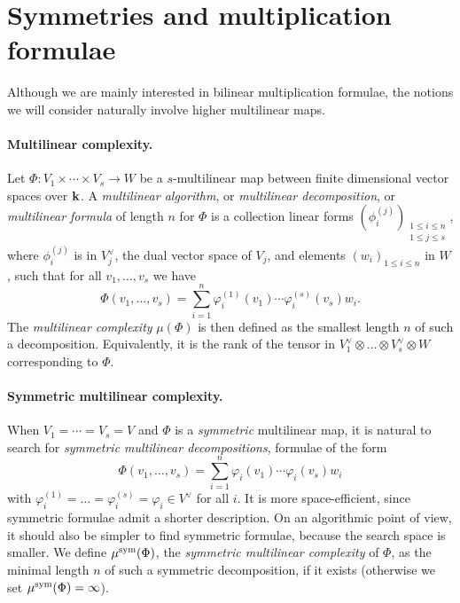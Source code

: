 \documentclass[11pt]{article}
\begin{document}
\section{Symmetries and multiplication formulae}
\label{sec:symtrisym}

Although we are mainly interested in bilinear multiplication formulae,
the notions we will consider naturally involve higher multilinear maps.

\paragraph{Multilinear complexity.}
Let $\Phi:V_1\times\cdots\times V_s\to W$
be a $s$-multilinear map between finite dimensional vector spaces over $\mathbf{k}$.
A \emph{multilinear algorithm}, or \emph{multilinear decomposition}, or \emph{multilinear formula} of length $n$ for $\Phi$ is a collection linear
forms $(\phi_i^{(j)})_{\substack{1\leq i \leq n\\1\leq j\leq s}}$,
where $\phi_i^{(j)}$ is in $V_j^\vee$, the dual vector space of $V_j$,
and elements $(w_i)_{1\leq i \leq n}$ in $W$, 
such that for all $v_1,\dots,v_s$ we have
\[
  \Phi(v_1,\dots,v_s)=\sum_{i=1}^{n}\varphi_i^{(1)}(v_1)\cdots\varphi_i^{(s)}(v_s)w_i.
\]
The \emph{multilinear complexity} $\mu(\Phi)$ is then defined as the smallest
length $n$ of such a decomposition.
Equivalently, it is the rank of the tensor in
$V_1^\vee \otimes\dots\otimes V_s^\vee\otimes W$
corresponding to $\Phi$.

\paragraph{Symmetric multilinear complexity.}
When $V_1=\cdots=V_s=V$ and $\Phi$ is a \emph{symmetric} multilinear map, it is
natural to search for \emph{symmetric multilinear decompositions}, \ie formulae of the form
\begin{equation*}
  \Phi(v_1,\dots,v_s)=\sum_{i=1}^{n}\varphi_i(v_1)\cdots\varphi_i(v_s)w_i
\end{equation*}
with $\varphi_i^{(1)}=\dots=\varphi_i^{(s)}=\varphi_i\in V^\vee$ for all $i$.
It is more space-efficient, since symmetric formulae admit a shorter description.
On an algorithmic point of view, it should also be simpler to find symmetric formulae,
because the search space is smaller. 
We define $\mu^{\textrm{sym}}(\Phi)$,
the \emph{symmetric multilinear complexity} of $\Phi$,
as the minimal length $n$ of such a symmetric decomposition, if it exists
(otherwise we set $\mu^{\textrm{sym}}(\Phi)=\infty$).
\end{document}
